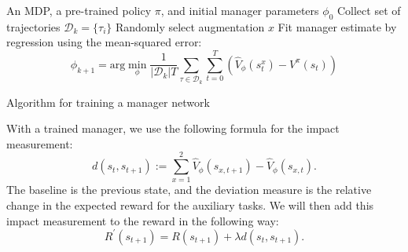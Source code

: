 \documentclass[12pt,A4]{report}
\theoremstyle{definition}
\begin{document}
\begin{algorithm}
\begin{algorithmic}[1]
\Require An MDP, a pre-trained policy $\pi$, and initial manager parameters $\phi_0$
  \State Collect set of trajectories $\mathcal{D}_k = \{\tau_i\}$
  \State Randomly select augmentation $x$
  \State Fit manager estimate by regression using the mean-squared error:
  \[ \phi_{k+1} = \text{arg} \min_\phi \frac{1}{|\mathcal{D}_k|T} \sum_{\tau \in \mathcal{D}_k} \sum_{t=0}^T \left( \hat{V}_\phi(s^x_t) - V^\pi (s_t) \right)\]
\EndFor
\end{algorithmic}
\caption{Algorithm for training a manager network}
  \label{alg:manager}
\end{algorithm}






With a trained manager, we use the following formula for the impact measurement:
\[ d(s_t,s_{t+1}) := \sum_{x=1}^2 \hat{V}_\phi(s_{x,t+1}) - \hat{V}_\phi(s_{x,t}).\]
The baseline is the previous state, and the deviation measure is the relative change in the expected reward for the auxiliary tasks. We will then add this impact measurement to the reward in the following way: 
\[ R^{\prime}(s_{t+1}) = R(s_{t+1}) + \lambda d(s_t,s_{t+1}).\]
\end{document}
